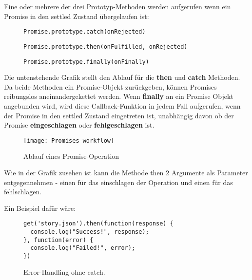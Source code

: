 \noindent
Eine oder mehrere der drei Prototyp-Methoden werden aufgerufen wenn ein Promise in den settled Zustand übergelaufen ist:

\begin{itemize}

\begin{figure}[H]
\item \begin{lstlisting}
Promise.prototype.catch(onRejected)
\end{lstlisting}
\end{figure}

\begin{figure}[H]
\item \begin{lstlisting}
Promise.prototype.then(onFulfilled, onRejected)
\end{lstlisting}
\end{figure}
 
\begin{figure}[H]
\item \begin{lstlisting} 
Promise.prototype.finally(onFinally)
\end{lstlisting}
\end{figure}
 
\end{itemize}

\noindent
Die untenstehende Grafik stellt den Ablauf für die \textbf{then} und \textbf{catch} Methoden. Da beide Methoden ein Promise-Objekt zurückgeben, können Promises reibungslos aneinandergekettet werden. Wenn \textbf{finally} an ein Promise Objekt angebunden wird, wird diese Callback-Funktion in jedem Fall aufgerufen, wenn der Promise in den settled Zustand eingetreten ist, unabhängig davon ob der Promise \textbf{eingeschlagen} oder \textbf{fehlgeschlagen} ist.


\begin{figure}[H]
\texttt{[image: Promises-workflow]}
\caption{Ablauf eines Promise-Operation \cite{promise-executor}}
\end{figure}

\noindent
Wie in der Grafik zusehen ist kann die Methode then 2 Argumente als Parameter entgegennehmen - einen für das einschlagen der Operation und einen für das fehlschlagen.

Ein Beispiel dafür wäre:

\begin{figure}[H]
\begin{lstlisting}
get('story.json').then(function(response) {
  console.log("Success!", response);
}, function(error) {
  console.log("Failed!", error);
})
\end{lstlisting}
\caption{Error-Handling ohne catch. \cite{callback-vs-promises}}
\end{figure}

